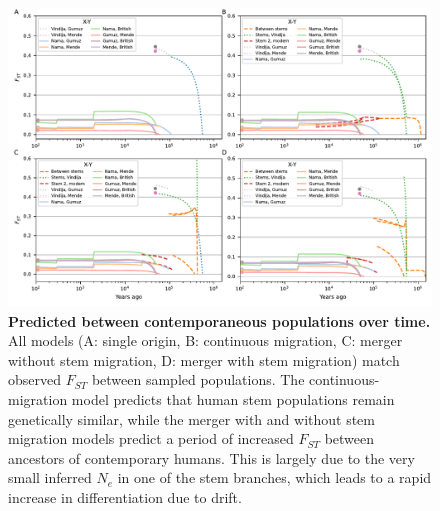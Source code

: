 \documentclass[]{article}
\begin{document}
\begin{figure}[ht]
    \centering
    \includegraphics[width=\textwidth]{figures/supp-fsts-all-models.pdf}
    \caption{
        \textbf{Predicted  between contemporaneous populations over time.}
        All models (A: single origin, B: continuous migration, C: merger without stem
        migration, D: merger with stem migration) match observed $F_{ST}$ between
        sampled populations. The continuous-migration model predicts that human stem
        populations remain genetically similar, while the merger with and without
        stem migration models predict a period of increased $F_{ST}$ between ancestors
        of contemporary humans. This is largely due to the very small inferred $N_e$ in one of
        the stem branches, which leads to a rapid increase in differentiation due to
        drift.
    }
    \label{fig:supp-FST-panels}
\end{figure}
\end{document}
